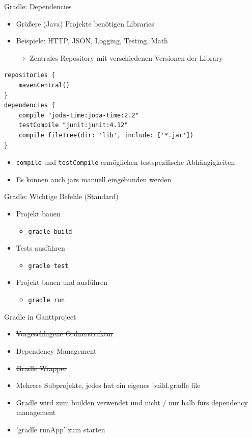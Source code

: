 \documentclass{beamer}
\begin{document}
\begin{frame}[fragile]{Gradle: Dependencies}
	\begin{itemize}
		\item Größere (Java) Projekte benötigen Libraries
		\item Beispiele: HTTP, JSON, Logging, Testing, Math
		\item[$\rightarrow$] Zentrales Repository mit verschiedenen Versionen der Library
	\end{itemize}
\begin{lstlisting}
repositories {
    mavenCentral()
}
dependencies {
    compile "joda-time:joda-time:2.2"
    testCompile "junit:junit:4.12"
    compile fileTree(dir: 'lib', include: ['*.jar'])  
}
\end{lstlisting}
\begin{itemize}
	\item \texttt{compile} und \texttt{testCompile} ermöglichen testspezifische Abhängigkeiten
	\item Es können auch jars manuell eingebunden werden
\end{itemize}
\end{frame}

\begin{frame}{Gradle: Wichtige Befehle (Standard)}
	\begin{itemize}
		\item Projekt bauen
		\begin{itemize}
			\item \texttt{gradle build}
		\end{itemize}
		\item Tests ausführen
		\begin{itemize}
			\item \texttt{gradle test}
		\end{itemize}
		\item Projekt bauen und ausführen
		\begin{itemize}
			\item \texttt{gradle run}
		\end{itemize}
	\end{itemize}
\end{frame}

\begin{frame}{Gradle in Ganttproject}
	\begin{itemize}
		\item \sout{Vorgeschlagene Ordnerstruktur}
		\item \sout{Dependency Management}
		\item \sout{Gradle Wrapper}
		\item Mehrere Subprojekte, jedes hat ein eigenes build.gradle file
		\item Gradle wird zum builden verwendet und nicht / nur halb fürs dependency management
		\item 'gradle runApp' zum starten
	\end{itemize}
\end{frame}
\end{document}
